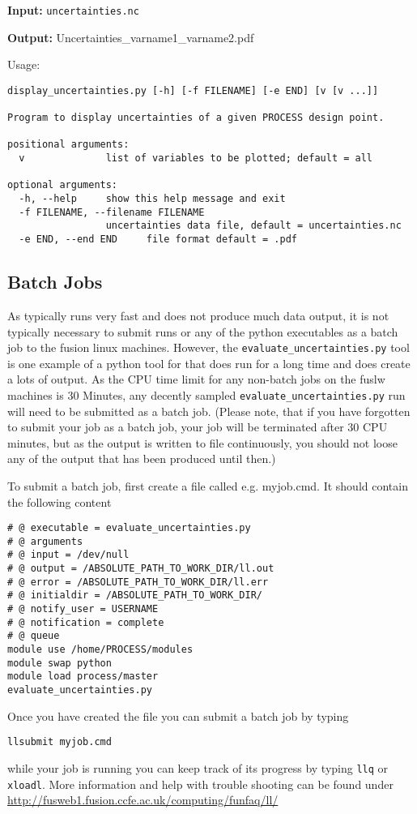\begin{description}
\item{\textbf{Input:}}
 \texttt{uncertainties.nc}
                                
\item{\textbf{Output:}}
Uncertainties\_varname1\_varname2.pdf
\end{description}

Usage:
\begin{verbatim}
display_uncertainties.py [-h] [-f FILENAME] [-e END] [v [v ...]]

Program to display uncertainties of a given PROCESS design point.

positional arguments:
  v              list of variables to be plotted; default = all

optional arguments:
  -h, --help     show this help message and exit
  -f FILENAME, --filename FILENAME
                 uncertainties data file, default = uncertainties.nc
  -e END, --end END     file format default = .pdf
\end{verbatim}

\subsection{Batch Jobs}
As \process\/ typically runs very fast and does not produce much data output,
it is not typically necessary to submit \process\/ runs or any of the python
executables as a batch job to the fusion linux machines. However, the
\texttt{evaluate\_uncertainties.py} tool is one example of a python tool for
\process\/ that does run for a long time and does create a lots of output. As
the CPU time limit for any non-batch jobs on the fuslw machines is 30 Minutes,
any decently sampled \texttt{evaluate\_uncertainties.py} run will need to be
submitted as a batch job. (Please note, that if you have forgotten to submit
your job as a batch job, your job will be terminated after 30 CPU minutes, but
as the output is written to file continuously, you should not loose any of the
output that has been produced until then.)

To submit a batch job, first create a file called e.g. myjob.cmd. It should
contain the following content
\begin{verbatim}
# @ executable = evaluate_uncertainties.py
# @ arguments 
# @ input = /dev/null
# @ output = /ABSOLUTE_PATH_TO_WORK_DIR/ll.out
# @ error = /ABSOLUTE_PATH_TO_WORK_DIR/ll.err
# @ initialdir = /ABSOLUTE_PATH_TO_WORK_DIR/
# @ notify_user = USERNAME
# @ notification = complete
# @ queue
module use /home/PROCESS/modules
module swap python
module load process/master
evaluate_uncertainties.py
\end{verbatim}
Once you have created the file you can submit a batch job by typing 
\begin{verbatim}
llsubmit myjob.cmd
\end{verbatim}
while your job is running you can keep track of its progress by typing
\texttt{llq} or \texttt{xloadl}. More information and help with trouble
shooting can be found under
\url{http://fusweb1.fusion.ccfe.ac.uk/computing/funfaq/ll/}


